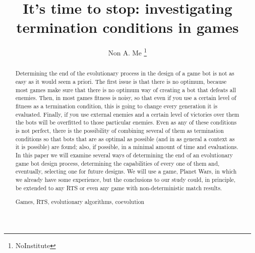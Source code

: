 \documentclass[runningheads,a4paper]{llncs}
\newcommand{\keywords}[1]{\par\addvspace\baselineskip
\noindent\keywordname\enspace\ignorespaces#1}
\begin{document}
\mainmatter  %

\title{It's time to stop: investigating termination conditions in games}


%
%
\author{Non A. Me%
\thanks{NoInstitute}}
%


%
%

\maketitle


\begin{abstract}
Determining the end of the evolutionary process in the design of a game bot is not as easy as it would seem a priori. The first issue is that there is no optimum, because most games make sure that there is no optimum way of creating a bot that defeats all enemies. Then, in most games fitness is noisy, so that even if you use a certain level of fitness as a termination condition, this is going to change every generation it is evaluated. Finally, if you use external enemies and a certain level of victories over them the bots will be overfitted to those particular enemies. Even as any of these conditions is not perfect, there is the possibility of combining several of them as termination conditions so that bots that are as optimal as possible (and in as general a context as it is possible) are found; also, if possible, in a minimal amount of time and evaluations. In this paper we will examine several ways of determining the end of an evolutionary game bot design process, determining the capabilities of every one of them and, eventually, selecting one for future designs. We will use a game, Planet Wars, in which we already have some experience, but the conclusions to our study could, in principle, be extended to any RTS or even any game with non-deterministic match results.
\keywords{Games, RTS, evolutionary algorithms, coevolution}
\end{abstract}
\end{document}
